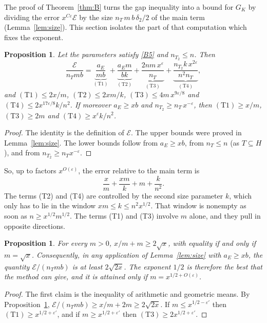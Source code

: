 \documentclass[11pt]{amsart}
\newcommand{\eps}{\varepsilon}
\theoremstyle{plain}
\newtheorem{proposition}[theorem]{Proposition}
\theoremstyle{definition}
\numberwithin{equation}{section}
\begin{document}
The proof of Theorem~\ref{thm:B} turns the gap inequality into a bound for $G_K$ by dividing the
error $x^{C\eps}\mathcal E$ by the size $n_T\,m\,b\,\delta_2/2$ of the main term
(Lemma~\ref{lem:size}). This section isolates the part of that computation which fixes the exponent.

\begin{proposition}\label{prop:terms}
Let the parameters satisfy \ref{B5} and $n_{T_2}\le n$. Then
\[
\frac{\mathcal E}{n_Tmb}=\underbrace{\frac{a_E}{mb}}_{(\mathrm{T}1)}+\underbrace{\frac{a_Em}{bk}}_{(\mathrm{T}2)}+\underbrace{\frac{2nm\,x^{\eps}}{n_T}}_{(\mathrm{T}3)}+\underbrace{\frac{n_{T_2}k\,x^{2\eps}}{n^2n_T}}_{(\mathrm{T}4)},
\]
and $(\mathrm{T}1)\le2x/m$, $(\mathrm{T}2)\le2xm/k$, $(\mathrm{T}3)\le4m\,x^{9\eps/8}$ and
$(\mathrm{T}4)\le2x^{17\eps/8}k/n^2$. If moreover $a_E\ge xb$ and $n_{T_2}\ge n_T\,x^{-\eps}$, then
$(\mathrm{T}1)\ge x/m$, $(\mathrm{T}3)\ge2m$ and $(\mathrm{T}4)\ge x^{\eps}k/n^2$.
\end{proposition}

\begin{proof}
The identity is the definition of $\mathcal E$. The upper bounds were proved in
Lemma~\ref{lem:size}. The lower bounds follow from $a_E\ge xb$, from $n_T\le n$ (as $T\subseteq H$),
and from $n_{T_2}\ge n_Tx^{-\eps}$.
\end{proof}

So, up to factors $x^{O(\eps)}$, the error relative to the main term is
\[
\frac{x}{m}+\frac{xm}{k}+m+\frac{k}{n^2}.
\]
The terms (T2) and (T4) are controlled by the second size parameter $k$, which only has to lie
in the window $xm\le k\le n^2x^{1/2}$. That window is nonempty as soon as $n\ge x^{1/2}m^{1/2}$.
The terms (T1) and (T3) involve $m$ alone, and they pull in opposite directions.

\begin{proposition}\label{prop:optimum}
For every $m>0$, $x/m+m\ge2\sqrt x$, with equality if and only if $m=\sqrt x$. Consequently, in
any application of Lemma~\ref{lem:size} with $a_E\ge xb$, the quantity $\mathcal E/(n_Tmb)$ is at
least $2\sqrt{2x}$. The exponent $1/2$ is therefore the best that the method can give, and it is
attained only if $m=x^{1/2+O(\eps)}$.
\end{proposition}

\begin{proof}
The first claim is the inequality of arithmetic and geometric means. By
Proposition~\ref{prop:terms}, $\mathcal E/(n_Tmb)\ge x/m+2m\ge2\sqrt{2x}$. If
$m\le x^{1/2-\eps'}$ then $(\mathrm{T}1)\ge x^{1/2+\eps'}$, and if $m\ge x^{1/2+\eps'}$ then
$(\mathrm{T}3)\ge2x^{1/2+\eps'}$.
\end{proof}
\end{document}

